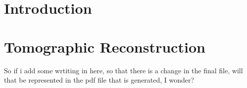 
\section{Introduction} %
	\label{sec:introduction}


\section{Tomographic Reconstruction} %
	\label{sec:tomographic_reconstruction}
	So if i add some wrtiting in here, so that there is a change in the final file, will that be represented in the pdf file that is generated, I wonder?

